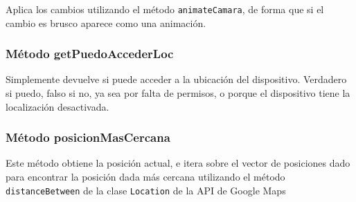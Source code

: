 Aplica los cambios utilizando el método \texttt{animateCamara}, de forma que si el cambio es brusco aparece como una animación.

\subsubsection{Método getPuedoAccederLoc}

Simplemente devuelve si puede acceder a la ubicación del dispositivo. Verdadero si puedo, falso si no, ya sea por falta de permisos, o porque el dispositivo tiene la localización desactivada.

\subsubsection{Método posicionMasCercana}

Este método obtiene la posición actual, e itera sobre el vector de posiciones dado para encontrar la posición dada más cercana utilizando el método \texttt{distanceBetween} de la clase \texttt{Location} de la API de Google Maps



